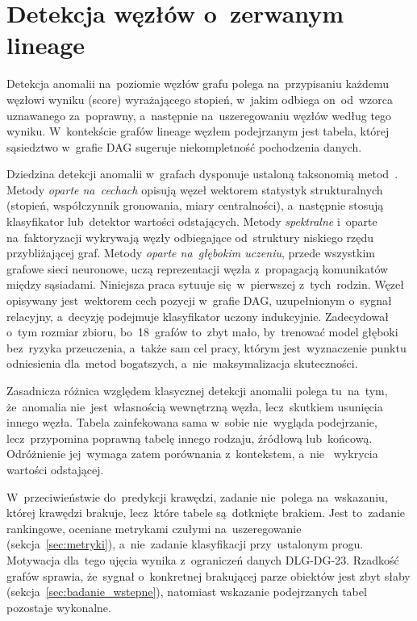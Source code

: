 \documentclass[polish,master,a4paper,oneside]{ppfcmthesis}
\renewcommand{\_}{\origtextunderscore\ifmmode\else\allowbreak\fi}
\begin{document}
\section{Detekcja węzłów o~zerwanym lineage}
\label{sec:node_detection}

Detekcja anomalii na~poziomie węzłów grafu polega na~przypisaniu każdemu
węzłowi wyniku (score) wyrażającego stopień, w~jakim odbiega on~od~wzorca
uznawanego za~poprawny, a~następnie na~uszeregowaniu węzłów według tego
wyniku. W~kontekście grafów lineage węzłem podejrzanym jest tabela, której
sąsiedztwo w~grafie DAG sugeruje niekompletność pochodzenia danych.

Dziedzina detekcji anomalii w~grafach dysponuje ustaloną taksonomią
metod~\cite{Akoglu2015,Ma2023}. Metody \emph{oparte na~cechach} opisują
węzeł wektorem statystyk strukturalnych (stopień, współczynnik gronowania,
miary centralności), a~następnie stosują klasyfikator lub~detektor wartości
odstających. Metody \emph{spektralne} i~oparte na~faktoryzacji wykrywają
węzły odbiegające od~struktury niskiego rzędu przybliżającej graf. Metody
\emph{oparte na~głębokim uczeniu}, przede wszystkim grafowe sieci neuronowe,
uczą reprezentacji węzła z~propagacją komunikatów między sąsiadami.
Niniejsza praca sytuuje się~w~pierwszej z~tych~rodzin. Węzeł opisywany
jest~wektorem cech pozycji w~grafie DAG, uzupełnionym o~sygnał relacyjny,
a~decyzję podejmuje klasyfikator uczony indukcyjnie. Zadecydował o~tym
rozmiar zbioru, bo~18~grafów to~zbyt mało, by~trenować model głęboki
bez~ryzyka przeuczenia, a~także sam cel pracy, którym jest~wyznaczenie
punktu odniesienia dla~metod bogatszych, a~nie~maksymalizacja skuteczności.

Zasadnicza różnica względem klasycznej detekcji anomalii polega tu~na~tym,
że~anomalia nie~jest~własnością wewnętrzną węzła, lecz~skutkiem
usunięcia innego węzła. Tabela zainfekowana sama w~sobie nie~wygląda
podejrzanie, lecz~przypomina poprawną tabelę innego rodzaju, źródłową
lub~końcową. Odróżnienie jej~wymaga zatem porównania z~kontekstem, a~nie~
wykrycia wartości odstającej.

W~przeciwieństwie do~predykcji krawędzi, zadanie nie~polega na~wskazaniu,
której krawędzi brakuje, lecz~które tabele są~dotknięte
brakiem. Jest to~zadanie rankingowe, oceniane metrykami czułymi
na~uszeregowanie (sekcja~\ref{sec:metryki}), a~nie~zadanie klasyfikacji
przy~ustalonym progu. Motywacja dla~tego ujęcia wynika z~ograniczeń danych DLG-DG-23.
Rzadkość grafów sprawia, że~sygnał o~konkretnej brakującej parze obiektów jest
zbyt słaby (sekcja~\ref{sec:badanie_wstepne}), natomiast wskazanie
podejrzanych tabel pozostaje wykonalne.
\end{document}
